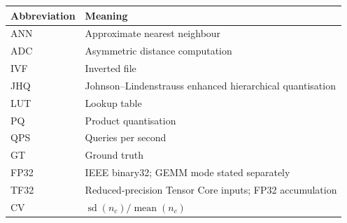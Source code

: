 \bigskip
\begin{longtable}{@{}>{\raggedright\arraybackslash}p{.25\linewidth}>{\raggedright\arraybackslash}p{.70\linewidth}@{}}
\toprule
Abbreviation & Meaning \\
\midrule
ANN & Approximate nearest neighbour \\
ADC & Asymmetric distance computation \\
IVF & Inverted file \\
JHQ & Johnson--Lindenstrauss enhanced hierarchical quantisation \\
LUT & Lookup table \\
PQ & Product quantisation \\
QPS & Queries per second \\
GT & Ground truth \\
FP32 & IEEE binary32; GEMM mode stated separately \\
TF32 & Reduced-precision Tensor Core inputs; FP32 accumulation \\
CV & $\operatorname{sd}(n_c)/\operatorname{mean}(n_c)$ \\
\bottomrule
\end{longtable}
\endgroup
